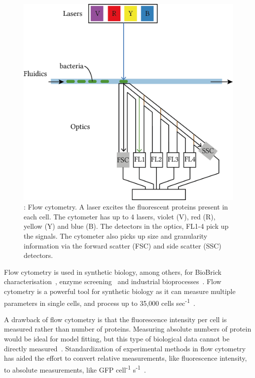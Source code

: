 \begin{figure}[tb]
	\begin{center}
		\includegraphics[scale=0.9]{../../chapters/chapterABCFlow/images/flow-overview.png}
	\caption[LoF caption]{\label{fig:flow_overv}: Flow cytometry. A laser excites the fluorescent proteins present in each cell. The cytometer has up to 4 lasers, violet (V), red (R), yellow (Y) and blue (B). The detectors in the optics, FL1-4 pick up the signals. The cytometer also picks up size and granularity information via the forward scatter (FSC) and side scatter (SSC) detectors. }
	\end{center}
\end{figure}


Flow cytometry is used in synthetic biology, among others, for BioBrick characterisation~\autocite{Kelly:2009bj}, enzyme screening~\autocite{Choi:2014gb} and industrial  bioprocesses~\autocite{Diaz:2010kw}. Flow cytometry is a powerful tool for synthetic biology as it can measure multiple parameters in single cells, and process up to 35,000 cells sec\textsuperscript{-1}~\autocite{Anonymous:2015tj}. 

A drawback of flow cytometry is that the fluorescence intensity per cell is measured rather than number of proteins. Measuring absolute numbers of protein would be ideal for model fitting, but this type of biological data cannot be directly measured~\autocite{Kelwick:2014iy}. Standardization of experimental methods in flow cytometry has aided the effort to convert relative measurements, like fluorescence intensity, to absolute measurements, like GFP cell\textsuperscript{-1} s\textsuperscript{-1}~\autocite{Kelly:2009bj, Kelwick:2014iy}. 

